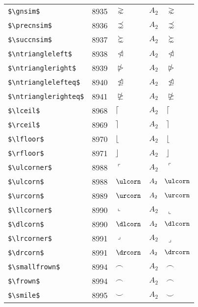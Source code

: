 \documentclass{article}
\begin{document}
\begin{table}
\begin{center}
\begin{tabular}{llll}
 \verb#$\gnsim$#              & 8935    & $\gnsim$              & $A_2\quad \gnsim$\\
 \verb#$\precnsim$#           & 8936    & $\precnsim$           & $A_2\quad \precnsim$\\
 \verb#$\succnsim$#           & 8937    & $\succnsim$           & $A_2\quad \succnsim$\\
 \verb#$\ntriangleleft$#      & 8938    & $\ntriangleleft$      & $A_2\quad \ntriangleleft$\\
 \verb#$\ntriangleright$#     & 8939    & $\ntriangleright$     & $A_2\quad \ntriangleright$\\
 \verb#$\ntrianglelefteq$#    & 8940    & $\ntrianglelefteq$    & $A_2\quad \ntrianglelefteq$\\
 \verb#$\ntrianglerighteq$#   & 8941    & $\ntrianglerighteq$   & $A_2\quad \ntrianglerighteq$\\
 \verb#$\lceil$#              & 8968    & $\lceil$              & $A_2\quad \lceil$\\
 \verb#$\rceil$#              & 8969    & $\rceil$              & $A_2\quad \rceil$\\
 \verb#$\lfloor$#             & 8970    & $\lfloor$             & $A_2\quad \lfloor$\\
 \verb#$\rfloor$#             & 8971    & $\rfloor$             & $A_2\quad \rfloor$\\
 \verb#$\ulcorner$#           & 8988    & $\ulcorner$           & $A_2\quad \ulcorner$\\
 \verb#$\ulcorn$#             & 8988    & $\ulcorn$             & $A_2\quad \ulcorn$\\
 \verb#$\urcorn$#             & 8989    & $\urcorn$             & $A_2\quad \urcorn$\\
 \verb#$\llcorner$#           & 8990    & $\llcorner$           & $A_2\quad \llcorner$\\
 \verb#$\dlcorn$#             & 8990    & $\dlcorn$             & $A_2\quad \dlcorn$\\
 \verb#$\lrcorner$#           & 8991    & $\lrcorner$           & $A_2\quad \lrcorner$\\
 \verb#$\drcorn$#             & 8991    & $\drcorn$             & $A_2\quad \drcorn$\\
 \verb#$\smallfrown$#         & 8994    & $\smallfrown$         & $A_2\quad \smallfrown$\\
 \verb#$\frown$#              & 8994    & $\frown$              & $A_2\quad \frown$\\
 \verb#$\smile$#              & 8995    & $\smile$              & $A_2\quad \smile$\\

\end{tabular}
\end{center}
\end{table}
\end{document}
